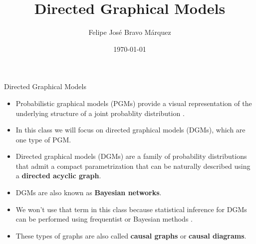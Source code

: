 \documentclass[handout]{beamer}
\title{Directed Graphical Models}
\author[Felipe Bravo Márquez]{\footnotesize
 \textcolor[rgb]{0.00,0.00,1.00}{Felipe José Bravo Márquez}}
\date{ \today }
\begin{document}
\begin{frame}
\titlepage


\end{frame}




\begin{frame}{Directed Graphical Models}
\scriptsize{
\begin{itemize}
\item Probabilistic graphical models (PGMs) provide a visual representation of the underlying structure of a joint probablity distribution \cite{ruozzi}.


\item In this class we will focus on directed graphical models (DGMs), which are one type of PGM.

\item Directed graphical models (DGMs) are a family of probability distributions that admit a compact parametrization that can be naturally described using a \textbf{directed acyclic graph}.

\item DGMs are also known as \textbf{Bayesian networks}.

\item We won't use that term in this class because statistical inference for DGMs can be performed using frequentist or Bayesian methods \cite{wasserman2013all}.

\item These types of graphs are also called \textbf{causal graphs} or \textbf{causal diagrams}.

 
\end{itemize}



} 

\end{frame}
\end{document}
